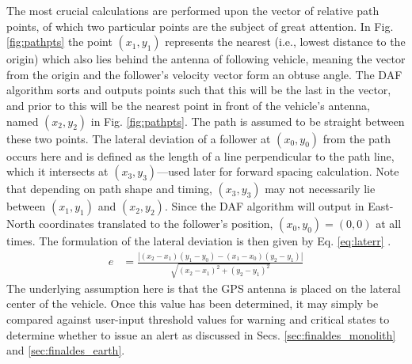 The most crucial calculations are performed upon the vector of relative path points, of which two particular points are the subject of great attention. In Fig. \ref{fig:pathpts} the point $(x_1,y_1)$ represents the nearest (i.e., lowest distance to the origin) which also lies behind the antenna of following vehicle, meaning the vector from the origin and the follower's velocity vector form an obtuse angle. The DAF algorithm sorts and outputs points such that this will be the last in the vector, and prior to this will be the nearest point in front of the vehicle's antenna, named $(x_2,y_2)$ in Fig. \ref{fig:pathpts}. The path is assumed to be straight between these two points. The lateral deviation of a follower at $(x_0, y_0)$ from the path occurs here and is defined as the length of a line perpendicular to the path line, which it intersects at $(x_3,y_3)$---used later for forward spacing calculation. Note that depending on path shape and timing, $(x_3,y_3)$ may not necessarily lie between $(x_1,y_1)$ and $(x_2,y_2)$. Since the DAF algorithm will output in East-North coordinates translated to the follower's position, $(x_0, y_0)=(0,0)$ at all times. The formulation of the lateral deviation is then given by Eq. \eqref{eq:laterr} \cite{laterrformula}. 
\begin{align} \label{eq:laterr}
    e &= \frac{ | (x_2 - x_1)(y_1 - y_0) - (x_1 - x_0)(y_2 - y_1) | } { \sqrt{ (x_2 - x_1)^2 + (y_2 - y_1)^2 } }
\end{align}
The underlying assumption here is that the GPS antenna is placed on the lateral center of the vehicle. Once this value has been determined, it may simply be compared against user-input threshold values for warning and critical states to determine whether to issue an alert as discussed in Secs. \ref{sec:finaldes_monolith} and \ref{sec:finaldes_earth}.

